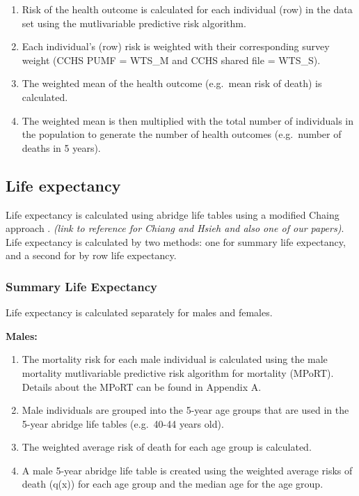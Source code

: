 \documentclass[]{book}
\begin{document}
\begin{enumerate}
\def\labelenumi{\arabic{enumi}.}
\item
  Risk of the health outcome is calculated for each individual (row) in the data set using the mutlivariable predictive risk algorithm.
\item
  Each individual's (row) risk is weighted with their corresponding survey weight (CCHS PUMF = WTS\_M and CCHS shared file = WTS\_S).
\item
  The weighted mean of the health outcome (e.g.~mean risk of death) is calculated.
\item
  The weighted mean is then multiplied with the total number of individuals in the population to generate the number of health outcomes (e.g.~number of deaths in 5 years).
\end{enumerate}

\hypertarget{life-expectancy}{%
\subsection{Life expectancy}\label{life-expectancy}}

Life expectancy is calculated using abridge life tables using a modified Chaing approach \citep{Chiang} \citep{Hsieh}. \emph{(link to reference for Chiang and Hsieh and also one of our papers)}. Life expectancy is calculated by two methods: one for summary life expectancy, and a second for by row life expectancy.

\hypertarget{summary-life-expectancy}{%
\subsubsection{Summary Life Expectancy}\label{summary-life-expectancy}}

Life expectancy is calculated separately for males and females.

\textbf{Males:}

\begin{enumerate}
\def\labelenumi{\arabic{enumi}.}
\item
  The mortality risk for each male individual is calculated using the male mortality mutlivariable predictive risk algorithm for mortality (MPoRT). Details about the MPoRT can be found in Appendix A.
\item
  Male individuals are grouped into the 5-year age groups that are used in the 5-year abridge life tables (e.g.~40-44 years old).
\item
  The weighted average risk of death for each age group is calculated.
\item
  A male 5-year abridge life table is created using the weighted average risks of death (q(x)) for each age group and the median age for the age group.
\end{enumerate}
\end{document}
